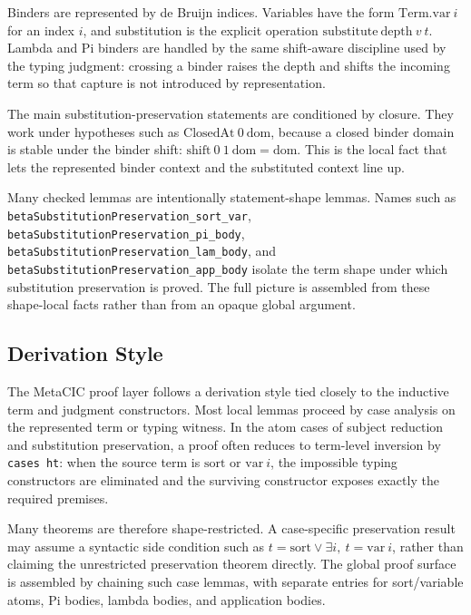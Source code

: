 Binders are represented by de Bruijn indices. Variables have the form
$\mathrm{Term.var}\ i$ for an index $i$, and substitution is the explicit
operation $\mathrm{substitute}\ \mathrm{depth}\ v\ t$. Lambda and Pi binders
are handled by the same shift-aware discipline used by the typing judgment:
crossing a binder raises the depth and shifts the incoming term so that
capture is not introduced by representation.

The main substitution-preservation statements are conditioned by closure.
They work under hypotheses such as $\mathrm{ClosedAt}\ 0\ \mathrm{dom}$,
because a closed binder domain is stable under the binder shift:
$\mathrm{shift}\ 0\ 1\ \mathrm{dom} = \mathrm{dom}$. This is the local fact
that lets the represented binder context and the substituted context line up.

Many checked lemmas are intentionally statement-shape lemmas. Names such as
\texttt{betaSubstitutionPreservation\_sort\_var},
\texttt{betaSubstitutionPreservation\_pi\_body},
\texttt{betaSubstitutionPreservation\_lam\_body}, and
\texttt{betaSubstitutionPreservation\_app\_body} isolate the term shape under
which substitution preservation is proved. The full picture is assembled from
these shape-local facts rather than from an opaque global argument.

\subsection{Derivation Style}\label{subsec:reconstruction-derivation-style}

The MetaCIC proof layer follows a derivation style tied closely to the
inductive term and judgment constructors. Most local lemmas proceed by case
analysis on the represented term or typing witness. In the atom cases of
subject reduction and substitution preservation, a proof often reduces to
term-level inversion by \texttt{cases ht}: when the source term is
$\mathrm{sort}$ or $\mathrm{var}\ i$, the impossible typing constructors are
eliminated and the surviving constructor exposes exactly the required
premises.

Many theorems are therefore shape-restricted. A case-specific preservation
result may assume a syntactic side condition such as
$t = \mathrm{sort} \vee \exists i,\ t = \mathrm{var}\ i$, rather than
claiming the unrestricted preservation theorem directly. The global proof
surface is assembled by chaining such case lemmas, with separate entries for
sort/variable atoms, Pi bodies, lambda bodies, and application bodies.

